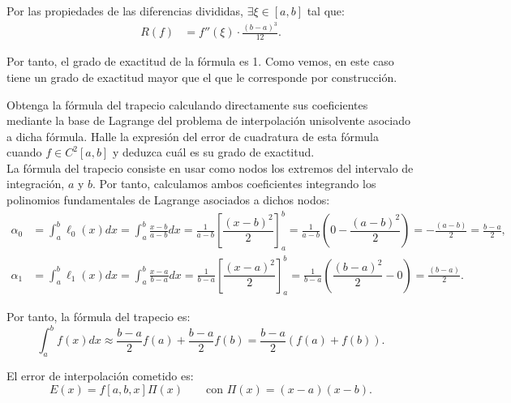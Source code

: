 \begin{ejercicio}
\begin{enumerate}
        Por las propiedades de las diferencias divididas, $\exists \xi \in [a, b]$ tal que:
        \begin{align*}
            R(f) &= f''(\xi)\cdot \frac{(b - a)^3}{12}.
        \end{align*}

        Por tanto, el grado de exactitud de la fórmula es 1. Como vemos, en este caso tiene un grado de exactitud mayor que el que le corresponde por construcción.
    \end{enumerate}
\end{ejercicio}

\begin{ejercicio}\label{ej:2.1.12}
    Obtenga la fórmula del trapecio calculando directamente sus coeficientes mediante la base de Lagrange del problema de interpolación unisolvente asociado a dicha fórmula. Halle la expresión del error de cuadratura de esta fórmula cuando $f \in C^2[a, b]$ y deduzca cuál es su grado de exactitud.\\

    La fórmula del trapecio consiste en usar como nodos los extremos del intervalo de integración, $a$ y $b$. Por tanto, calculamos ambos coeficientes integrando los polinomios fundamentales de Lagrange asociados a dichos nodos:
    \begin{align*}
        \alpha_0 &= \int_{a}^{b} \ell_0(x) dx = \int_{a}^{b} \frac{x - b}{a - b} dx = \frac{1}{a - b} \left[\dfrac{(x-b)^2}{2}\right]_{a}^{b} = \frac{1}{a - b} \left(0 - \dfrac{(a-b)^2}{2}\right) = -\frac{(a-b)}{2} = \frac{b-a}{2},\\
        \alpha_1 &= \int_{a}^{b} \ell_1(x) dx = \int_{a}^{b} \frac{x - a}{b - a} dx = \frac{1}{b - a} \left[\dfrac{(x-a)^2}{2}\right]_{a}^{b} = \frac{1}{b - a} \left(\dfrac{(b-a)^2}{2} - 0\right) = \frac{(b-a)}{2}.
    \end{align*}

    Por tanto, la fórmula del trapecio es:
    \begin{equation*}
        \int_{a}^{b} f(x) dx \approx \frac{b-a}{2} f(a) + \frac{b-a}{2} f(b) = \frac{b-a}{2} (f(a) + f(b)).
    \end{equation*}

    El error de interpolación cometido es:
    \begin{equation*}
        E(x) = f[a,b,x]\Pi(x)\qquad \text{con } \Pi(x) = (x - a)(x - b).
    \end{equation*}


\end{ejercicio}

